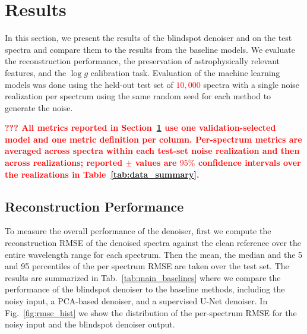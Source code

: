 \documentclass[twocolumn]{aastex7}
\newcommand{\ld}[1]{\textcolor{red}{\textbf{#1}}}
\begin{document}


\section{Results}
\label{sec:results}

In this section, we present the results of the blindspot denoiser and on the test spectra and compare them to the results from the baseline models. We evaluate the reconstruction performance, the preservation of astrophysically relevant features, and the $\log g$ calibration task. Evaluation of the machine learning models was done using the held-out test set of \ld{$10{,}000$} spectra with a single noise realization per spectrum using the same random seed for each method to generate the noise.

\ld{??? All metrics reported in Section~\ref{sec:results} use one validation-selected model and one metric definition per column. Per-spectrum metrics are averaged across spectra within each test-set noise realization and then across realizations; reported $\pm$ values are $95\%$ confidence intervals over the realizations in Table~\ref{tab:data_summary}.}

\subsection{Reconstruction Performance}
\label{sec:results_denoising}

To measure the overall performance of the denoiser, first we compute the reconstruction RMSE of the denoised spectra against the clean reference over the entire wavelength range for each spectrum. Then the mean, the median and the 5 and 95 percentiles of the per spectrum RMSE are taken over the test set. The results are summarized in Tab.~\ref{tab:main_baselines} where we compare the performance of the blindspot denoiser to the baseline methods, including the noisy input, a PCA-based denoiser, and a supervised U-Net denoiser. In Fig.~\ref{fig:rmse_hist} we show the distribution of the per-spectrum RMSE for the noisy input and the blindspot denoiser output.
\end{document}
